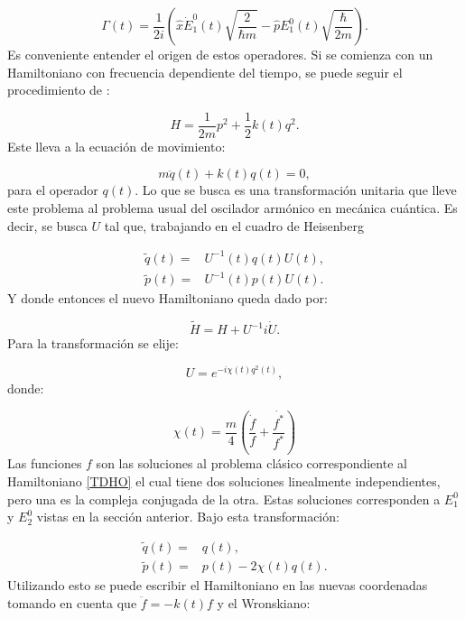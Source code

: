 \documentclass[a4paper,10pt]{report}
\begin{document}
\begin{equation}
\Gamma(t) = \frac{1}{2i}(\hat{x}\dot{E}_1^0(t)\sqrt{\frac{2}{\hbar m}}-\hat{p}E_1^0(t)\sqrt{\frac{\hbar}{2m}}).
\end{equation}Es conveniente entender el origen de estos operadores. Si se comienza con un Hamiltoniano con frecuencia dependiente del tiempo, se puede seguir el procedimiento de \cite{BrownPT}:

\begin{equation}\label{TDHO}
H = \frac{1}{2m}p^2 + \frac{1}{2}k(t)q^2.
\end{equation} Este lleva a la ecuación de movimiento:

\begin{equation}
m\ddot{q}(t) + k(t)q(t) = 0,
\end{equation} para el operador $q(t)$. Lo que se busca es una transformación unitaria que lleve este problema al problema usual del oscilador armónico en mecánica cuántica. Es decir, se busca $U$ tal que, trabajando en el cuadro de Heisenberg \cite{SakuraiQM}

\begin{align}
\tilde{q}(t) =& U^{-1}(t)q(t)U(t),\\
\tilde{p}(t) =& U^{-1}(t)p(t)U(t).
\end{align} Y donde entonces el nuevo Hamiltoniano queda dado por:

\begin{equation}
\tilde{H} = H + U^{-1}i\dot{U}.
\end{equation} Para la transformación se elije:

\begin{equation}
U = e^{-i\chi(t)q^2(t)},
\end{equation} donde:

\begin{equation}
\chi(t) = \frac{m}{4}(\frac{\dot{f}}{f}+\frac{\dot{f^*}}{f^*})
\end{equation} Las funciones $f$ son las soluciones al problema clásico correspondiente al Hamiltoniano \ref{TDHO} el cual tiene dos soluciones linealmente independientes, pero una es la compleja conjugada de la otra. Estas soluciones corresponden a $E_1^0$  y $E_2^0$ vistas en la sección anterior. Bajo esta transformación:

\begin{align}
\tilde{q}(t)=&q(t),\\
\tilde{p}(t)=&p(t)-2\chi(t)q(t).
\end{align}Utilizando esto se puede escribir el Hamiltoniano en las nuevas coordenadas tomando en cuenta que $\ddot{f}= -k(t)f$ y el Wronskiano:
\end{document}

